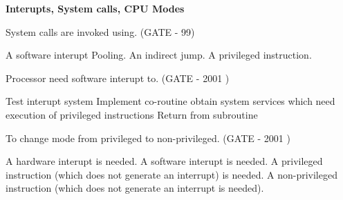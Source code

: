 
\centerline{\textbf{ \LARGE Interupts, System calls, CPU Modes}}



\begin{questyle}

  \question System calls are invoked using. (GATE - 99)

  \begin{oneparchoices}
    \CorrectChoice A software interupt
    \choice Pooling.
    \choice An indirect jump.
    \choice A privileged instruction.
  \end{oneparchoices}

    \end{questyle}





\begin{questyle}

  \question Processor need software interupt to. (GATE - 2001 )

  \begin{choices}
    \choice Test interupt system
    \choice Implement co-routine
    \CorrectChoice obtain system services which need execution of privileged instructions
    \choice Return from subroutine
  \end{choices}

  \end{questyle}




\begin{questyle}

  \question To change mode from privileged to non-privileged. (GATE - 2001 )

  \begin{choices}
    \choice A hardware interupt is needed.
    \choice A software interupt is needed.
    \choice A privileged instruction (which does not generate an interrupt) is needed.
    \CorrectChoice A non-privileged instruction (which does not generate an interrupt is needed).
  \end{choices}

  \end{questyle}


